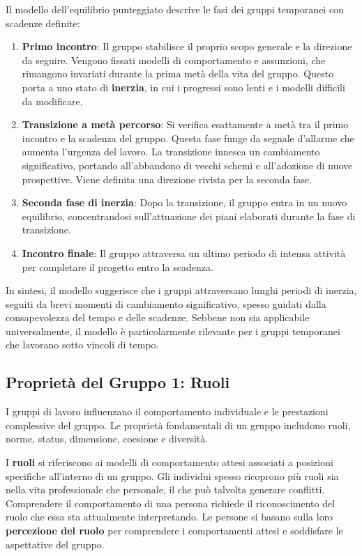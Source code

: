 \documentclass{article}
\begin{document}
Il modello dell'equilibrio punteggiato descrive le fasi dei gruppi temporanei con scadenze definite:

\begin{enumerate}
    \item \textbf{Primo incontro}: Il gruppo stabilisce il proprio scopo generale e la direzione da seguire. Vengono fissati modelli di comportamento e assunzioni, che rimangono invariati durante la prima metà della vita del gruppo. Questo porta a uno stato di \textbf{inerzia}, in cui i progressi sono lenti e i modelli difficili da modificare.
    
    \item \textbf{Transizione a metà percorso}: Si verifica esattamente a metà tra il primo incontro e la scadenza del gruppo. Questa fase funge da segnale d'allarme che aumenta l'urgenza del lavoro. La transizione innesca un cambiamento significativo, portando all'abbandono di vecchi schemi e all'adozione di nuove prospettive. Viene definita una direzione rivista per la seconda fase.
    
    \item \textbf{Seconda fase di inerzia}: Dopo la transizione, il gruppo entra in un nuovo equilibrio, concentrandosi sull'attuazione dei piani elaborati durante la fase di transizione.
    
    \item \textbf{Incontro finale}: Il gruppo attraversa un ultimo periodo di intensa attività per completare il progetto entro la scadenza.
\end{enumerate}

In sintesi, il modello suggerisce che i gruppi attraversano lunghi periodi di inerzia, seguiti da brevi momenti di cambiamento significativo, spesso guidati dalla consapevolezza del tempo e delle scadenze. Sebbene non sia applicabile universalmente, il modello è particolarmente rilevante per i gruppi temporanei che lavorano sotto vincoli di tempo.

\subsection{Proprietà del Gruppo 1: Ruoli}

I gruppi di lavoro influenzano il comportamento individuale e le prestazioni complessive del gruppo. Le proprietà fondamentali di un gruppo includono ruoli, norme, status, dimensione, coesione e diversità.

I \textbf{ruoli} si riferiscono ai modelli di comportamento attesi associati a posizioni specifiche all'interno di un gruppo. Gli individui spesso ricoprono più ruoli sia nella vita professionale che personale, il che può talvolta generare conflitti. Comprendere il comportamento di una persona richiede il riconoscimento del ruolo che essa sta attualmente interpretando. Le persone si basano sulla loro \textbf{percezione del ruolo} per comprendere i comportamenti attesi e soddisfare le aspettative del gruppo.
\end{document}
